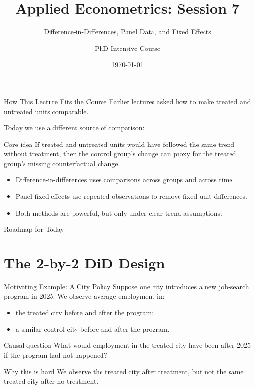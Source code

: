 \documentclass[11pt,aspectratio=169]{beamer}
\title{Applied Econometrics: Session 7}
\subtitle{Difference-in-Differences, Panel Data, and Fixed Effects}
\author{PhD Intensive Course}
\institute{Lecture 7}
\date{\today}
\begin{document}
\begin{frame}
  \titlepage
\end{frame}

\begin{frame}{How This Lecture Fits the Course}
  Earlier lectures asked how to make treated and untreated units comparable.
  \vspace{0.4em}

  Today we use a different source of comparison:
  \begin{block}{Core idea}
    If treated and untreated units would have followed the same trend without treatment, then the control group's change can proxy for the treated group's missing counterfactual change.
  \end{block}

  \begin{itemize}
    \item Difference-in-differences uses comparisons across groups and across time.
    \item Panel fixed effects use repeated observations to remove fixed unit differences.
    \item Both methods are powerful, but only under clear trend assumptions.
  \end{itemize}
\end{frame}

\begin{frame}{Roadmap for Today}
  \tableofcontents
\end{frame}

\section{The 2-by-2 DiD Design}

\begin{frame}{Motivating Example: A City Policy}
  Suppose one city introduces a new job-search program in 2025.
  We observe average employment in:
  \begin{itemize}
    \item the treated city before and after the program;
    \item a similar control city before and after the program.
  \end{itemize}
  \vspace{0.3em}
  \begin{block}{Causal question}
    What would employment in the treated city have been after 2025 if the program had not happened?
  \end{block}
  \begin{block}{Why this is hard}
    We observe the treated city after treatment, but not the same treated city after no treatment.
  \end{block}
\end{frame}
\end{document}
